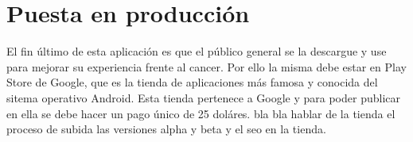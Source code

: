 \documentclass[../pfc.tex]{subfiles}
\begin{document}
	\section{Puesta en producción}	
	
	El fin último de esta aplicación es que el público general se la descargue y use para mejorar su experiencia frente al cancer. Por ello la misma debe estar en Play Store de Google, que es la tienda de aplicaciones más famosa y conocida del sitema operativo Android. Esta tienda pertenece a Google y para poder publicar en ella se debe hacer un pago único de 25 doláres. bla bla hablar de la tienda el proceso de subida las versiones alpha y beta y el seo en la tienda.
	
\end{document}
